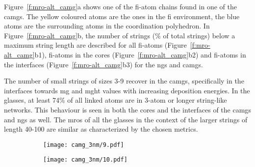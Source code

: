 \begin{changebar}
Figure~\ref{f:mro-alt_camg}a shows one of the \gls{fi}-atom chains found in one of the \gls{camg}s. The yellow coloured atoms are the ones in the \gls{fi} environment, the blue atoms are the surrounding atoms in the coordination polyhedron. In Figure~\ref{f:mro-alt_camg}b, the number of strings (\% of total strings) below a maximum string length are described for all \gls{fi}-atoms (Figure~\ref{f:mro-alt_camg}b1), \gls{fi}-atoms in the cores (Figure~\ref{f:mro-alt_camg}b2) and \gls{fi}-atoms in the interfaces (Figure~\ref{f:mro-alt_camg}b3) for the \gls{ng}s and \gls{camg}s. \par The number of small strings of sizes 3-9 recover in the \gls{camg}s, specifically in the interfaces towards \gls{mg} and \gls{mght} values with increasing deposition energies. In the glasses, at least 74\% of all linked atoms are in 3-atom or longer string-like networks. This behaviour is seen in both the cores and the interfaces of the \gls{camg}s and \gls{ng}s as well. The \gls{mro}s of all the glasses in the context of the larger strings of length 40-100 are similar as characterized by the chosen metrics. \par

\begin{figure}[!h]
	\centering
	\begin{subfigure}{0.5\textwidth} \centering
		\texttt{[image: camg\_3nm/9.pdf]}
	\end{subfigure}%
	\hfill
	\begin{subfigure}{0.5\textwidth} \centering
		\texttt{[image: camg\_3nm/10.pdf]}
	\end{subfigure}%
	\label{f:mro_camg}
\end{figure}


\end{changebar}
